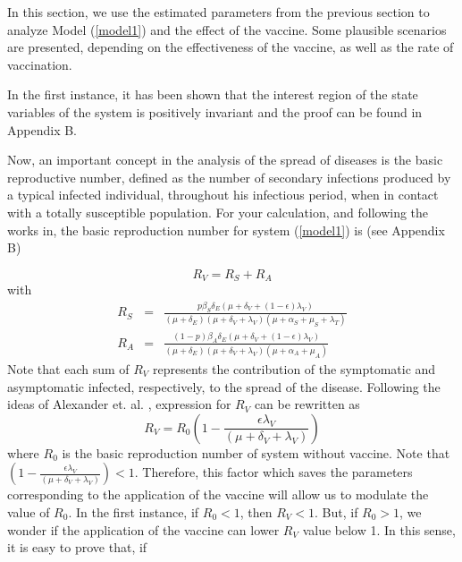 In this section, we use the estimated parameters from the previous section to
analyze Model (\ref{model1}) and the effect of the vaccine. Some plausible
scenarios are presented, depending on the effectiveness of the vaccine,  as
well as the rate of vaccination.

In the first instance, it has been shown that the interest region of the state
variables of the system is positively invariant and the proof can be found in
Appendix B.


Now, an important concept in the analysis of the spread of diseases is the
basic reproductive number, defined as the number of secondary infections
produced by a typical infected individual, throughout his infectious period,
when in contact with a totally susceptible population. For your calculation,
and following the works in\cite{Diekmann1990, Van2002}, the basic reproduction
number for system (\ref{model1}) is (see Appendix B) 

\begin{equation}\label{Rv}
    R_{V}=R_S+R_A
\end{equation}
with
\begin{eqnarray*}
    R_S &=& \frac{p\beta_S\delta_E(\mu+\delta_V+(1-\epsilon)
            \lambda_V)}{(\mu+\delta_E)(\mu+\delta_V+\lambda_V)(\mu+\alpha_S+\mu_S+\lambda_T)}
    \\
    R_A &=& \frac{(1-p) \beta_A \delta_E (\mu + \delta_V + (1-\epsilon)
            \lambda_V)}{(\mu+\delta_E)(\mu + \delta_V + \lambda_V)(\mu + \alpha_A + \mu_A)}
\end{eqnarray*}
 Note that each sum of $ R_ {V} $ represents the contribution of the symptomatic and asymptomatic infected,
 respectively, to the spread of the disease.
Following the ideas of Alexander et. al. \cite{Alexander2004}, expression for $R_V$ can be rewritten as
%
\begin{equation}\label{Rv2}
R_{V}=R_0\left(1- \frac{\epsilon \lambda_V}{(\mu+\delta_V+\lambda_V)}\right)
\end{equation}
where $R_0$ is the basic reproduction number of system without vaccine.
Note that
$\left(1- \frac{\epsilon \lambda_V}{(\mu+\delta_V+\lambda_V)}\right)<1$. Therefore, this factor which saves the
parameters corresponding to the application of the vaccine will allow us to modulate the value of $ R_0 $. In the
first instance, if $ R_0 <1 $, then $ R_V <1 $. But, if $ R_0> 1 $, we wonder if the application of the vaccine can
lower $R_V$ value below 1. In this sense, it is easy to prove that, if

